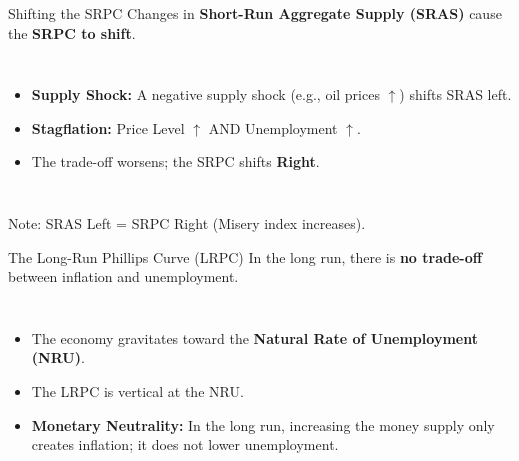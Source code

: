 \documentclass[aspectratio=169]{beamer}
\begin{document}
\begin{frame}{Shifting the SRPC}
    Changes in \textbf{Short-Run Aggregate Supply (SRAS)} cause the \textbf{SRPC to shift}.
    
    \begin{columns}
        \begin{itemize}
            \item \textbf{Supply Shock:} A negative supply shock (e.g., oil prices $\uparrow$) shifts SRAS left.
            \item \textbf{Stagflation:} Price Level $\uparrow$ AND Unemployment $\uparrow$.
            \item The trade-off worsens; the SRPC shifts \textbf{Right}.
        \end{itemize}
        
    \end{columns}
    \vspace{0.2cm}
    \small{Note: SRAS Left = SRPC Right (Misery index increases).}
\end{frame}

\begin{frame}{The Long-Run Phillips Curve (LRPC)}
    In the long run, there is \textbf{no trade-off} between inflation and unemployment.
    
    \begin{columns}
        \begin{itemize}
            \item The economy gravitates toward the \textbf{Natural Rate of Unemployment (NRU)}.
            \item The LRPC is vertical at the NRU.
            \item \textbf{Monetary Neutrality:} In the long run, increasing the money supply only creates inflation; it does not lower unemployment.
        \end{itemize}
        
    \end{columns}
\end{frame}
\end{document}
